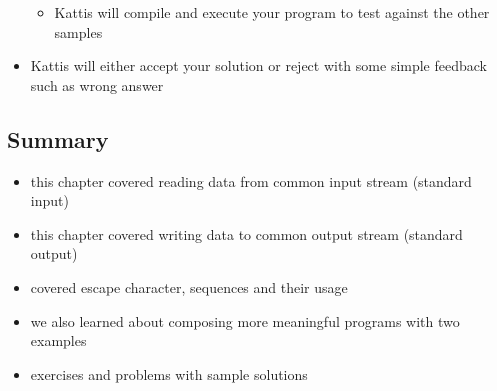 \documentclass[11pt]{article}
\makeatletter
\providecommand{\tightlist}{%
      \setlength{\itemsep}{0pt}\setlength{\parskip}{0pt}}
\newcommand{\boxspacing}{\kern\kvtcb@left@rule\kern\kvtcb@boxsep}
\newcommand{\prompt}[4]{
        {\ttfamily\llap{{\color{#2}[#3]:\hspace{3pt}#4}}\vspace{-\baselineskip}}
    }
\makeatother
\begin{document}
\begin{itemize}
  \begin{itemize}
  \tightlist
  \item
    Kattis will compile and execute your program to test against the
    other samples
  \end{itemize}
\item
  Kattis will either accept your solution or reject with some simple
  feedback such as wrong answer
\end{itemize}

    \hypertarget{summary}{%
\subsection{Summary}\label{summary}}

\begin{itemize}
\tightlist
\item
  this chapter covered reading data from common input stream (standard
  input)
\item
  this chapter covered writing data to common output stream (standard
  output)
\item
  covered escape character, sequences and their usage
\item
  we also learned about composing more meaningful programs with two
  examples
\item
  exercises and problems with sample solutions
\end{itemize}

    \begin{tcolorbox}[breakable, size=fbox, boxrule=1pt, pad at break*=1mm,colback=cellbackground, colframe=cellborder]
\prompt{In}{incolor}{ }{\boxspacing}
\begin{Verbatim}[commandchars=\\\{\}]

\end{Verbatim}
\end{tcolorbox}


    
    
    
\end{document}
